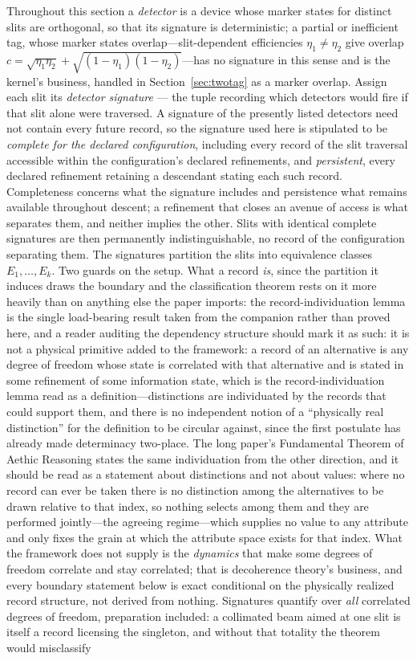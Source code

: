 Throughout this section a \emph{detector} is a device whose marker states for distinct slits are orthogonal, so that its signature is deterministic; a partial or inefficient tag, whose marker states overlap---slit-dependent efficiencies $\eta_1 \neq \eta_2$ give overlap $c = \sqrt{\eta_1\eta_2} + \sqrt{(1-\eta_1)(1-\eta_2)}$---has no signature in this sense and is the kernel's business, handled in Section~\ref{sec:twotag} as a marker overlap. Assign each slit its \emph{detector signature} --- the tuple recording which detectors would fire if that slit alone were traversed. A signature of the presently listed detectors need not contain every future record, so the signature used here is stipulated to be \emph{complete for the declared configuration}, including every record of the slit traversal accessible within the configuration's declared refinements, and \emph{persistent}, every declared refinement retaining a descendant stating each such record. Completeness concerns what the signature includes and persistence what remains available throughout descent; a refinement that closes an avenue of access is what separates them, and neither implies the other. Slits with identical complete signatures are then permanently indistinguishable, no record of the configuration separating them. The signatures partition the slits into equivalence classes $E_1, \dots, E_k$. Two guards on the setup. What a record \emph{is}, since the partition it induces draws the boundary and the classification theorem rests on it more heavily than on anything else the paper imports: the record-individuation lemma is the single load-bearing result taken from the companion rather than proved here, and a reader auditing the dependency structure should mark it as such: it is not a physical primitive added to the framework: a record of an alternative is any degree of freedom whose state is correlated with that alternative and is stated in some refinement of some information state, which is the record-individuation lemma read as a definition---distinctions are individuated by the records that could support them, and there is no independent notion of a ``physically real distinction'' for the definition to be circular against, since the first postulate has already made determinacy two-place. The long paper's Fundamental Theorem of Aethic Reasoning \cite{Aethus} states the same individuation from the other direction, and it should be read as a statement about distinctions and not about values: where no record can ever be taken there is no distinction among the alternatives to be drawn relative to that index, so nothing selects among them and they are performed jointly---the agreeing regime---which supplies no value to any attribute and only fixes the grain at which the attribute space exists for that index. What the framework does not supply is the \emph{dynamics} that make some degrees of freedom correlate and stay correlated; that is decoherence theory's business, and every boundary statement below is exact conditional on the physically realized record structure, not derived from nothing. Signatures quantify over \emph{all} correlated degrees of freedom, preparation included: a collimated beam aimed at one slit is itself a record licensing the singleton, and without that totality the theorem would misclassify 